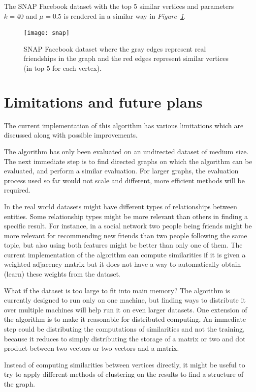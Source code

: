 \documentclass[12pt]{report}
\begin{document}
The SNAP Facebook dataset with the top 5 similar vertices and parameters $k=40$
and $\mu=0.5$ is rendered in a similar way in \emph{Figure~\ref{fig:snap}}.

\begin{figure}[tbp]
  \texttt{[image: snap]}
  \caption{SNAP Facebook dataset where the gray edges represent real friendships
  in the graph and the red edges represent similar vertices (in top 5 for each
  vertex).}
  \label{fig:snap}
\end{figure}

%
%
\section{Limitations and future plans}
%
The current implementation of this algorithm has various limitations which are
discussed along with possible improvements.


The algorithm has only been evaluated on an undirected dataset of medium size.
The next immediate step is to find directed graphs on which the algorithm can
be evaluated, and perform a similar evaluation. For larger graphs, the evaluation
process used so far would not scale and different, more efficient methods will
be required.


In the real world datasets might have different types of relationships between
entities. Some relationship types might be more relevant than others in finding
a specific result. For instance, in a social network two people being friends
might be more relevant for recommending new friends than two people following the
same topic, but also using both features might be better than only one of them.
The current implementation of the algorithm can compute similarities if it is
given a weighted adjacency matrix but it does not have a way to automatically
obtain (learn) these weights from the dataset.


What if the dataset is too large to fit into main memory? The algorithm is
currently designed to run only on one machine, but finding ways to distribute it
over multiple machines will help run it on even larger datasets. One extension
of the algorithm is to make it reasonable for distributed computing. An immediate
step could be distributing the computations of similarities and not the training,
because it reduces to simply distributing the storage of a matrix or two and dot
product between two vectors or two vectors and a matrix.


Instead of computing similarities between vertices directly, it might be useful
to try to apply different methods of clustering on the results to find a structure
of the graph.


\newpage
{}
{}

\end{document}
